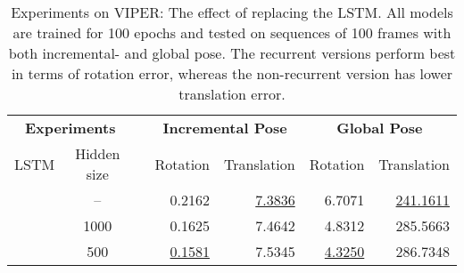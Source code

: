 		\begin{table}[tb]
			\small
			\begin{center}
				\begin{tabular}{cccrrrr}
					\toprule
					\multicolumn{2}{c}{\textbf{Experiments}} & & \multicolumn{2}{c}{\textbf{Incremental Pose}} & \multicolumn{2}{c}{\textbf{Global Pose}} \\
					LSTM 	& Hidden size 		& 	& Rotation 	& Translation & Rotation & Translation \\
					\midrule
					\xmark	& -- 				&	& 0.2162	& \underline{7.3836}	& 6.7071	& \underline{241.1611}		\\
					
					\cmark	& 1000				& 	& 0.1625	&	7.4642 	& 4.8312&	285.5663		\\
					\cmark 	& 500				& 	&\underline{0.1581}	& 7.5345 	& \underline{4.3250}&	286.7348	 \\
					\bottomrule
					
				\end{tabular}
			\end{center}
			\caption[Experiments on VIPER: The effect of replacing the LSTM]
					{Experiments on VIPER: The effect of replacing the LSTM.
					 All models are trained for 100 epochs and tested on sequences of 100 frames with both incremental- and global pose.
					 The recurrent versions perform best in terms of rotation error, whereas the non-recurrent version has lower translation error.
					 \label{tbl:viper-effect-of-replacing-LSTM}}
		\end{table}
		
